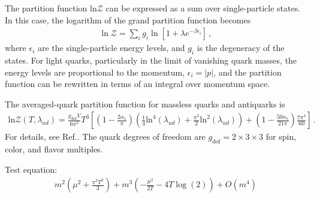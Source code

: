 The partition function $\mathrm{ln}\mathcal{Z}$ can be expressed as a sum over single-particle states. In this case, the logarithm of the grand partition function becomes
\begin{align}
    \ln \mathcal{Z} = \sum_i g_i \ln \left[ 1 + \lambda e^{-\beta \epsilon_i} \right]\,,
\end{align}
where $\epsilon_i$ are the single-particle energy levels, and $g_i$ is the degeneracy of the states. For light quarks, particularly in the limit of vanishing quark masses, the energy levels are proportional to the momentum, $\epsilon_i = |p|$, and the partition function can be rewritten in terms of an integral over momentum space.

The averaged-quark partition function for massless quarks and antiquarks is
\begin{align}
    \mathrm{ln}\mathcal{Z}(T,\lambda_{ud}) = \frac{g_{\mathrm{dof}}V}{6\pi^{2}}T^{3} \left[ \left(1-\frac{2\alpha_{s}}{\pi}\right) \left( \frac{1}{4} \mathrm{ln}^{4}(\lambda_{ud}) + \frac{\pi^{2}}{2} \mathrm{ln}^{2}(\lambda_{ud}) \right) + \left(1-\frac{50\alpha_{s}}{21\pi}\right) \frac{7\pi^{4}}{60} \right]\,.
\end{align}
For details, see Ref.. The quark degrees of freedom are $g_\mathrm{dof}=2\times3\times3$ for spin, color, and flavor multiples.

Test equation:
\begin{align}
    m^2 \left(\mu ^2+\frac{\pi ^2 T^2}{3}\right)+m^3 \left(-\frac{\mu ^2}{2 T}-4 T \log (2)\right)+O\left(m^4\right)
\end{align}




